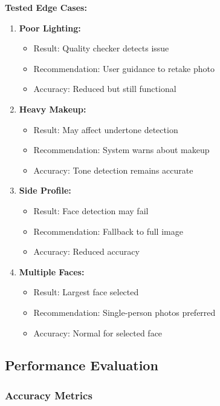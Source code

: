 \textbf{Tested Edge Cases:}
\begin{enumerate}
    \item \textbf{Poor Lighting:}
    \begin{itemize}
        \item Result: Quality checker detects issue
        \item Recommendation: User guidance to retake photo
        \item Accuracy: Reduced but still functional
    \end{itemize}
    
    \item \textbf{Heavy Makeup:}
    \begin{itemize}
        \item Result: May affect undertone detection
        \item Recommendation: System warns about makeup
        \item Accuracy: Tone detection remains accurate
    \end{itemize}
    
    \item \textbf{Side Profile:}
    \begin{itemize}
        \item Result: Face detection may fail
        \item Recommendation: Fallback to full image
        \item Accuracy: Reduced accuracy
    \end{itemize}
    
    \item \textbf{Multiple Faces:}
    \begin{itemize}
        \item Result: Largest face selected
        \item Recommendation: Single-person photos preferred
        \item Accuracy: Normal for selected face
    \end{itemize}
\end{enumerate}

\subsection{Performance Evaluation}

\subsubsection{Accuracy Metrics}

